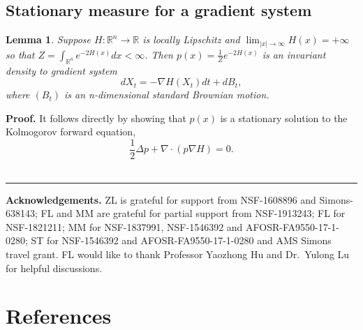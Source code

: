 \documentclass[]{elsarticle}
\def\R{\mathbb{R}}
\newtheorem{lemma}[theorem]{Lemma}
\newenvironment{proof}[1][Proof]{\noindent\textbf{#1.} }{\ \rule{0.5em}{0.5em}}
\numberwithin{equation}{section}
\numberwithin{theorem}{section}
\begin{document}
\subsection{Stationary measure for a gradient system}
\begin{lemma}\label{lemma:GradS_inv}
Suppose $H:\R^n\to \R$ is locally Lipschitz and $\lim_{|x|\to\infty} H(x) = +\infty$ so that $Z= \int_{\R^n}e^{-2H(x)} dx<\infty$. Then $p(x)= \frac{1}{Z} e^{-2H(x)}$ is an invariant density to gradient system 
\begin{equation*}
dX_t= -\nabla H(X_t)dt +dB_t,
\end{equation*}
where $(B_t) $ is an n-dimensional standard Brownian motion. 
\end{lemma}\vspace{-2mm}
\begin{proof}
It follows directly by showing that $p(x)$ is a stationary solution to the Kolmogorov forward equation,
\[\frac{1}{2} \Delta p + \nabla \cdot (p \nabla H) = 0.  
\]
\end{proof}

\bigskip 

\noindent \textbf{Acknowledgements.} {ZL is grateful for support from NSF-1608896 and Simons-638143; FL and MM are grateful for partial support from NSF-1913243; FL for NSF-1821211; MM for NSF-1837991, NSF-1546392 and AFOSR-FA9550-17-1-0280; ST for NSF-1546392 and AFOSR-FA9550-17-1-0280 and AMS Simons travel grant.  FL would like to thank Professor Yaozhong Hu and Dr.~Yulong Lu for helpful discussions. }



\section*{References}


% 
\end{document}
